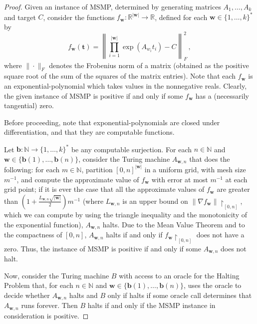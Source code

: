 \documentclass[format=acmsmall, review=false, screen=true]{acmart}
\newcommand{\Reals}{\mathbb{R}}
\newcommand{\Naturals}{\mathbb{N}}
\newcommand{\myvector}{\boldsymbol}
\begin{document}
\begin{proof}
Given an instance of MSMP, determined by generating matrices $A_1,\ldots,A_k$ and target $C$,
consider the functions $f_{\myvector{w}} : \mathbb{R}^{|\myvector{w}|} \rightarrow \Reals$,
defined for each $\myvector{w} \in {\lbrace 1, \ldots, k \rbrace}^*$ by
\begin{equation*}
    f_{\myvector{w}}(\myvector{t}) = {\left \| \prod \limits_{i=1}^{\lvert \myvector{w} \rvert} \exp(A_{w_{i}} t_{i}) - C \right \|}_{F}^2 \, ,
\end{equation*}
where $\| \cdot \|_F$ denotes the Frobenius norm of a matrix (obtained
as the positive square root of the sum of the squares of the matrix entries).  Note that each
$f_{\myvector{w}}$ is an exponential-polynomial which takes values in
the nonnegative reals. Clearly, the given instance of MSMP is positive
if and only if some $f_{\myvector{w}}$ has a (necessarily tangential)
zero.

Before proceeding, note that exponential-polynomials are closed under differentiation, and that they are computable functions.

Let $\myvector{b} : \Naturals \rightarrow {\lbrace 1, \ldots, k
  \rbrace}^*$ be any computable surjection.
For each $n \in \Naturals$ and $\myvector{w} \in \lbrace
\myvector{b}(1), \ldots, \myvector{b}(n) \rbrace$, consider the Turing
machine $A_{\myvector{w}, n}$ that does the following: for each $m
\in \Naturals$, partition ${[0,n]}^{\lvert \myvector{w} \rvert}$ in a
uniform grid, with mesh size $m^{-1}$, and compute the approximate
value of $f_{\myvector{w}}$ with error at most $m^{-1}$ at each grid
point; if it is ever the case that all the approximate values of
$f_{\myvector{w}}$ are greater than $\left(1+ \frac{L_{\myvector{w},
    n}\sqrt{\lvert \myvector{w} \rvert}}{2} \right) m^{-1}$ (where
$L_{\myvector{w}, n}$ is an upper bound on ${\| \nabla
  f_{\myvector{w}} \|}\restriction_{[0,n]}$, which we can compute by
using the triangle inequality and the monotonicity of the exponential
function), $A_{\myvector{w}, n}$ halts.  Due to the Mean Value Theorem
and to the compactness of $[0,n]$, $A_{\myvector{w}, n}$ halts if and
only if $f_{\myvector{w}} \restriction_{[0,n]}$ does not have a zero.
Thus, the instance of MSMP is positive if and only if some
$A_{\myvector{w}, n}$ does not halt.

Now, consider the Turing machine $B$ with access to an oracle for the  Halting Problem
that, for each $n \in
\Naturals$ and $\myvector{w} \in \lbrace \myvector{b}(1), \ldots,
\myvector{b}(n) \rbrace$, uses the oracle to decide whether
$A_{\myvector{w}, n}$ halts and $B$ only if halts if some oracle 
call determines that $A_{\myvector{w}, n}$ runs forever.
Then $B$ halts if and only if the MSMP instance
in consideration is positive.
\end{proof}
\end{document}
